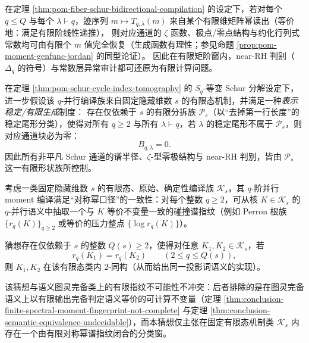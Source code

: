 \begin{corollary}[有限矩阶窗内的全谱审计可判定性]\label{cor:pom-finite-q-window-decidable-full-audit}
在定理 \ref{thm:pom-fiber-schur-bidirectional-compilation} 的设定下，若对每个 \(q\le Q\) 与每个 \(\lambda\vdash q\)，迹序列 \(m\mapsto T_{q,\lambda}(m)\) 来自某个有限维矩阵幂读出（等价地：满足有限阶线性递推），
则对应通道的 \(\zeta\) 函数、极点/零点结构与约化行列式常数均可由有限个 \(m\) 值完全恢复（生成函数有理性；参见命题 \ref{prop:pom-moment-genfunc-jordan} 的同型论证）。
因此在有限矩阶窗内，near-RH 判别（\(\Delta_q\) 的符号）与常数层异常审计都可还原为有限计算问题。
\end{corollary}

\begin{conjecture}\label{conj:pom-schur-finite-support}
在定理 \ref{thm:pom-schur-cycle-index-tomography} 的 \(S_q\)-等变 Schur 分解设定下，
进一步假设该 \(q\)-并行编译族来自固定隐藏维数 \(s\) 的有限态机制，并满足一种\emph{表示稳定/有限生成}制度：
存在仅依赖于 \(s\) 的有限分拆族 \(\mathcal{P}_s\)（以“去掉第一行长度”的稳定尾形分类），使得对所有 \(q\ge2\) 与所有 \(\lambda\vdash q\)，若 \(\lambda\) 的稳定尾形不属于 \(\mathcal{P}_s\)，则对应通道块必为零：
\[
B_{q,\lambda}=0.
\]
因此所有非平凡 Schur 通道的谱半径、\(\zeta\)-型零极结构与 near-RH 判别，皆由 \(\mathcal{P}_s\) 这一有限形状族所控制。
\end{conjecture}

\begin{conjecture}\label{conj:pom-sympower-collision-spectrum-rigidity}
考虑一类固定隐藏维数 \(s\) 的有限态、原始、确定性编译族 \(\mathcal K_s\)，其 \(q\)-阶并行 moment 编译满足“对称幂口径”的一致性：对每个整数 \(q\ge 2\)，可从核 \(K\in\mathcal K_s\) 的 \(q\)-并行语义中抽取一个与 \(K\) 等价不变量一致的碰撞谱指纹（例如 Perron 根族 \(\{r_q(K)\}_{q\ge 2}\) 或等价的压力整点 \(\{\log r_q(K)\}\)）。
\par
猜想存在仅依赖于 \(s\) 的整数 \(Q(s)\ge 2\)，使得对任意 \(K_1,K_2\in\mathcal K_s\)，若
\[
r_q(K_1)=r_q(K_2)\qquad(2\le q\le Q(s)),
\]
则 \(K_1,K_2\) 在该有限态类内 \(2\)-同构（从而给出同一投影词语义的实现）。
\par
该猜想与语义图灵完备类上的有限指纹不可能性不冲突：后者排除的是在图灵完备语义上以有限输出完备判定语义等价的可计算不变量（定理 \ref{thm:conclusion-finite-spectral-moment-fingerprint-not-complete} 与定理 \ref{thm:conclusion-semantic-equivalence-undecidable}），而本猜想仅主张在固定有限态机制类 \(\mathcal K_s\) 内存在一个由有限对称幂谱指纹闭合的分类窗。
\end{conjecture}

